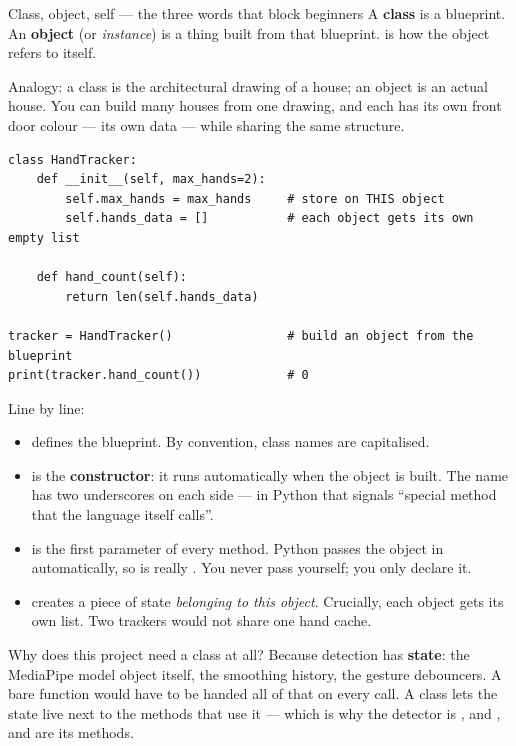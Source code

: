 \begin{pythonconcept}{Class, object, self --- the three words that block beginners}
A \textbf{class} is a blueprint. An \textbf{object} (or \emph{instance}) is a thing built from that
blueprint.  is how the object refers to itself.

Analogy: a class is the architectural drawing of a house; an object is an actual house. You can build
many houses from one drawing, and each has its own front door colour --- its own data --- while
sharing the same structure.

\begin{lstlisting}
class HandTracker:
    def __init__(self, max_hands=2):
        self.max_hands = max_hands     # store on THIS object
        self.hands_data = []           # each object gets its own empty list

    def hand_count(self):
        return len(self.hands_data)

tracker = HandTracker()                # build an object from the blueprint
print(tracker.hand_count())            # 0
\end{lstlisting}

Line by line:

\begin{itemize}
  \item {} defines the blueprint. By convention, class names are capitalised.
  \item {} is the \textbf{constructor}: it runs automatically when the object is
        built. The name has two underscores on each side --- in Python that signals ``special method
        that the language itself calls''.
  \item {} is the first parameter of every method. Python passes the object in
        automatically, so  is really
        . You never pass  yourself; you only
        declare it.
  \item {} creates a piece of state \emph{belonging to this object}.
        Crucially, each object gets its own list. Two trackers would not share one hand cache.
\end{itemize}

Why does this project need a class at all? Because detection has \textbf{state}: the MediaPipe model
object itself, the smoothing history, the gesture debouncers. A bare function would have to be handed
all of that on every call. A class lets the state live next to the methods that use it --- which is
why the detector is , and ,  and
 are its methods.
\end{pythonconcept}

